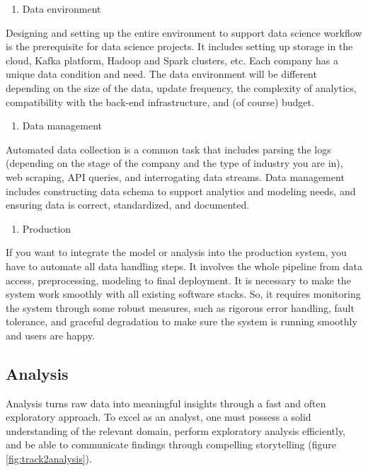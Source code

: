 \documentclass[
  12pt,
]{krantz}
\providecommand{\tightlist}{%
  \setlength{\itemsep}{0pt}\setlength{\parskip}{0pt}}
\begin{document}
\begin{enumerate}
\def\labelenumi{(\arabic{enumi})}
\tightlist
\item
  Data environment
\end{enumerate}

Designing and setting up the entire environment to support data science workflow is the prerequisite for data science projects. It includes setting up storage in the cloud, Kafka  platform, Hadoop  and Spark  clusters, etc. Each company has a unique data condition and need. The data environment will be different depending on the size of the data, update frequency, the complexity of analytics, compatibility with the back-end infrastructure, and (of course) budget.

\begin{enumerate}
\def\labelenumi{(\arabic{enumi})}
\setcounter{enumi}{1}
\tightlist
\item
  Data management
\end{enumerate}

Automated data collection is a common task that includes parsing the logs (depending on the stage of the company and the type of industry you are in), web scraping, API queries, and interrogating data streams. Data management includes constructing data schema to support analytics and modeling needs, and ensuring data is correct, standardized, and documented.

\begin{enumerate}
\def\labelenumi{(\arabic{enumi})}
\setcounter{enumi}{2}
\tightlist
\item
  Production
\end{enumerate}

If you want to integrate the model or analysis into the production system, you have to automate all data handling steps. It involves the whole pipeline from data access, preprocessing, modeling to final deployment. It is necessary to make the system work smoothly with all existing software stacks. So, it requires monitoring the system through some robust measures, such as rigorous error handling, fault tolerance, and graceful degradation to make sure the system is running smoothly and users are happy.

\hypertarget{analysis}{%
\subsection{Analysis}\label{analysis}}

Analysis turns raw data into meaningful insights through a fast and often exploratory approach. To excel as an analyst, one must possess a solid understanding of the relevant domain, perform exploratory analysis efficiently, and be able to communicate findings through compelling storytelling (figure \ref{fig:track2analysis}).
\end{document}
